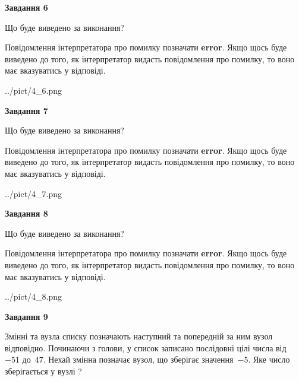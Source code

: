 \documentclass[12pt, ukrainian]{article}
\begin{document}
{\begin {large}
{\begin {center}\textbf{Завдання 6}\end {center}}\par
Що буде виведено за виконання?

Повідомлення інтерпретатора про помилку позначати \textbf{error}.
Якщо щось буде виведено до того, як інтерпретатор видасть повідомлення про помилку, 
то воно має вказуватись у відповіді. \par


\begin{center}
	{../pict/4_6.png}
\end{center}
\newpage

{\begin {center}\textbf{Завдання 7}\end {center}}\par
Що буде виведено за виконання?

Повідомлення інтерпретатора про помилку позначати \textbf{error}.
Якщо щось буде виведено до того, як інтерпретатор видасть повідомлення про помилку, 
то воно має вказуватись у відповіді. \par


\begin{center}
	{../pict/4_7.png}
\end{center}
\newpage

{\begin {center}\textbf{Завдання 8}\end {center}}\par
Що буде виведено за виконання?

Повідомлення інтерпретатора про помилку позначати \textbf{error}.
Якщо щось буде виведено до того, як інтерпретатор видасть повідомлення про помилку, 
то воно має вказуватись у відповіді. \par


\begin{center}
	{../pict/4_8.png}
\end{center}
\newpage

{\begin {center}\textbf{Завдання 9}\end {center}}\par
Змінні  та  вузла списку позначають наступний та попередній за ним вузол відповідно. Починаючи з голови, у список записано послідовні цілі числа від~$-51$ до~$47$. Нехай змінна  позначає вузол, що зберігає значення~$-5$.
Яке число зберігається у вузлі  ?\par
\newpage


\end{large}}
\end{document}

